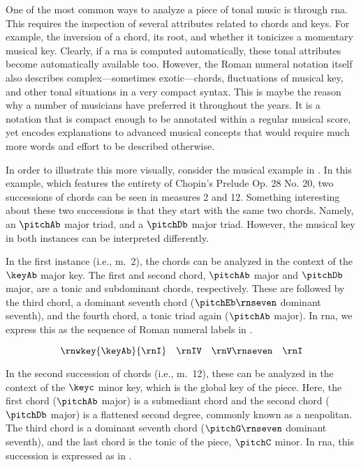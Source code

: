 
One of the most common ways to analyze a piece of tonal
music is through \gls{rna}. This requires the inspection of
several attributes related to chords and keys. For example,
the inversion of a chord, its root, and whether it tonicizes
a momentary musical key. Clearly, if a \gls{rna} is computed
automatically, these tonal attributes become automatically
available too. However, the Roman numeral notation itself
also describes complex---sometimes exotic---chords,
fluctuations of musical key, and other tonal situations in a
very compact syntax. This is maybe the reason why a number
of musicians have preferred it throughout the years. It is a
notation that is compact enough to be annotated within a
regular musical score, yet encodes explanations to advanced
musical concepts that would require much more words and
effort to be described otherwise.

In order to illustrate this more visually, consider the
musical example in . In this
example, which features the entirety of Chopin's Prelude Op.
28 No. 20, two successions of chords can be seen in measures
2 and 12. Something interesting about these two successions
is that they start with the same two chords. Namely, an
$\pitchAb$ major triad, and a $\pitchDb$ major triad.
However, the musical key in both instances can be
interpreted differently.


In the first instance (i.e., m.~2), the chords can be
analyzed in the context of the $\keyAb$ major key. The first
and second chord, $\pitchAb$ major and $\pitchDb$ major, are
a tonic and subdominant chords, respectively. These are
followed by the third chord, a dominant seventh chord
($\pitchEb\rnseven$ dominant seventh), and the fourth chord,
a tonic triad again ($\pitchAb$ major). In \gls{rna}, we
express this as the sequence of Roman numeral labels in
.

\begin{equation}
    \label{eq:succession1}
    \rnwkey{\keyAb}{\rnI} \quad \rnIV \quad \rnV\rnseven \quad \rnI
\end{equation}

In the second succession of chords (i.e., m.~12), these can
be analyzed in the context of the $\keyc$ minor key, which
is the global key of the piece. Here, the first chord
($\pitchAb$ major) is a submediant chord and the second
chord ($\pitchDb$ major) is a flattened second degree,
commonly known as a \gls{neapolitan}. The third chord is a
dominant seventh chord ($\pitchG\rnseven$ dominant seventh),
and the last chord is the tonic of the piece, $\pitchC$
minor. In \gls{rna}, this succession is expressed as in
.

